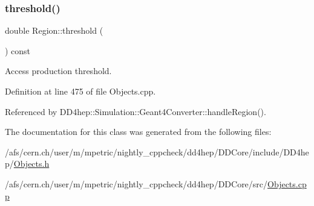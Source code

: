 \subsubsection{\texorpdfstring{threshold()}{threshold()}}
{\footnotesize\ttfamily double Region\+::threshold (\begin{DoxyParamCaption}{ }\end{DoxyParamCaption}) const}



Access production threshold. 



Definition at line 475 of file Objects.\+cpp.



Referenced by D\+D4hep\+::\+Simulation\+::\+Geant4\+Converter\+::handle\+Region().



The documentation for this class was generated from the following files\+:\begin{DoxyCompactItemize}
\item 
/afs/cern.\+ch/user/m/mpetric/nightly\+\_\+cppcheck/dd4hep/\+D\+D\+Core/include/\+D\+D4hep/\hyperlink{_objects_8h}{Objects.\+h}\item 
/afs/cern.\+ch/user/m/mpetric/nightly\+\_\+cppcheck/dd4hep/\+D\+D\+Core/src/\hyperlink{_objects_8cpp}{Objects.\+cpp}\end{DoxyCompactItemize}

